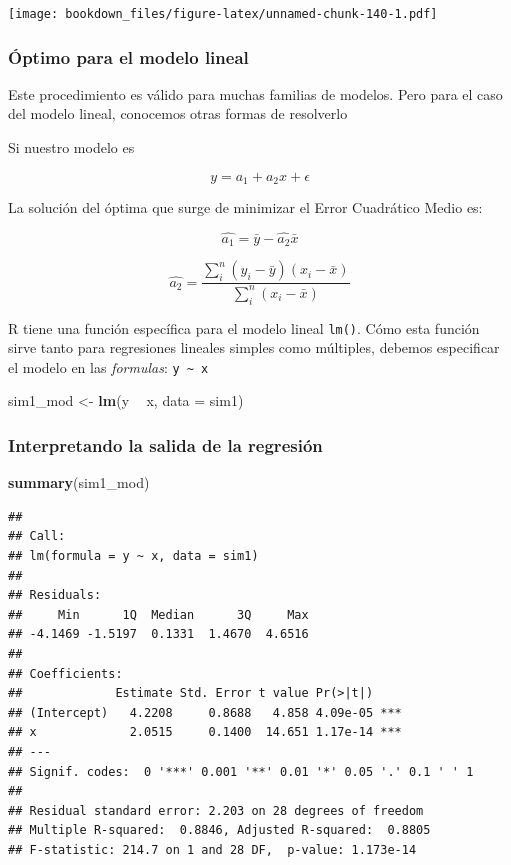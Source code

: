 \documentclass[]{book}
\newenvironment{Shaded}{\begin{snugshade}}{\end{snugshade}}
\newcommand{\DataTypeTok}[1]{\textcolor[rgb]{0.13,0.29,0.53}{#1}}
\newcommand{\KeywordTok}[1]{\textcolor[rgb]{0.13,0.29,0.53}{\textbf{#1}}}
\newcommand{\NormalTok}[1]{#1}
\newcommand{\OperatorTok}[1]{\textcolor[rgb]{0.81,0.36,0.00}{\textbf{#1}}}
\newcommand{\StringTok}[1]{\textcolor[rgb]{0.31,0.60,0.02}{#1}}
\begin{document}
\texttt{[image: bookdown\_files/figure-latex/unnamed-chunk-140-1.pdf]}

\hypertarget{optimo-para-el-modelo-lineal}{%
\subsubsection{Óptimo para el modelo lineal}\label{optimo-para-el-modelo-lineal}}

Este procedimiento es válido para muchas familias de modelos. Pero para el caso del modelo lineal, conocemos otras formas de resolverlo

Si nuestro modelo es

\[
y = a_1 + a_2x + \epsilon
\]

La solución del óptima que surge de minimizar el Error Cuadrático Medio es:

\[
\hat{a_1} = \bar{y} - \hat{a_2}\bar{x} 
\]

\[
\hat{a_2} = \frac{\sum_i^n (y_i -\bar{y})(x_i -\bar{x})}{\sum_i^n (x_i- \bar{x})}
\]

R tiene una función específica para el modelo lineal \texttt{lm()}. Cómo esta función sirve tanto para regresiones lineales simples como múltiples, debemos especificar el modelo en las \emph{formulas}: \texttt{y\ \textasciitilde{}\ x}

\begin{Shaded}
\begin{Highlighting}[]
\NormalTok{sim1_mod <-}\StringTok{ }\KeywordTok{lm}\NormalTok{(y }\OperatorTok{~}\StringTok{ }\NormalTok{x, }\DataTypeTok{data =}\NormalTok{ sim1)}
\end{Highlighting}
\end{Shaded}

\hypertarget{interpretando-la-salida-de-la-regresion}{%
\subsubsection{Interpretando la salida de la regresión}\label{interpretando-la-salida-de-la-regresion}}

\begin{Shaded}
\begin{Highlighting}[]
\KeywordTok{summary}\NormalTok{(sim1_mod)}
\end{Highlighting}
\end{Shaded}

\begin{verbatim}
## 
## Call:
## lm(formula = y ~ x, data = sim1)
## 
## Residuals:
##     Min      1Q  Median      3Q     Max 
## -4.1469 -1.5197  0.1331  1.4670  4.6516 
## 
## Coefficients:
##             Estimate Std. Error t value Pr(>|t|)    
## (Intercept)   4.2208     0.8688   4.858 4.09e-05 ***
## x             2.0515     0.1400  14.651 1.17e-14 ***
## ---
## Signif. codes:  0 '***' 0.001 '**' 0.01 '*' 0.05 '.' 0.1 ' ' 1
## 
## Residual standard error: 2.203 on 28 degrees of freedom
## Multiple R-squared:  0.8846, Adjusted R-squared:  0.8805 
## F-statistic: 214.7 on 1 and 28 DF,  p-value: 1.173e-14
\end{verbatim}
\end{document}
